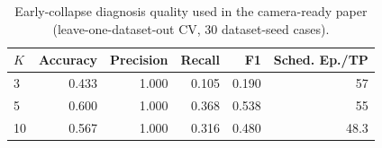 \begin{table}[t]
  \centering
  \caption{Early-collapse diagnosis quality used in the camera-ready paper (leave-one-dataset-out CV, 30 dataset-seed cases).}
  \label{tab:diagnostic-boundaries}
  \begin{tabular}{lrrrrr}
    \toprule
    \textbf{$K$} & \textbf{Accuracy} & \textbf{Precision} & \textbf{Recall} & \textbf{F1} & \textbf{Sched. Ep./TP} \\
    \midrule
    3  & 0.433 & 1.000 & 0.105 & 0.190 & 57 \\
    5  & 0.600 & 1.000 & 0.368 & 0.538 & 55 \\
    10 & 0.567 & 1.000 & 0.316 & 0.480 & 48.3 \\
    \bottomrule
  \end{tabular}
\end{table}

